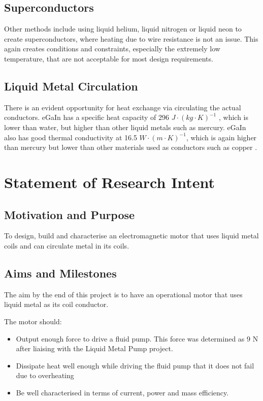 \documentclass[a4paper,12pt]{article}
\begin{document}
\subsection{Superconductors}
Other methods include using liquid helium\cite{hoenigDenseSupercriticalheliumCooled1975}, liquid nitrogen or liquid neon\cite{henkeChallengesOpportunitiesVery2018} to create superconductors, where heating due to wire resistance is not an issue. This again creates conditions and constraints, especially the extremely low temperature, that are not acceptable for most design requirements.

\subsection{Liquid Metal Circulation}
There is an evident opportunity for heat exchange via circulating the actual conductors. eGaIn has a specific heat capacity of 296 $J\cdot (kg\cdot K)^{-1}$ \cite{hodesPotentialGalinstanBasedMinichannel2014}, which is lower than water, but higher than other liquid metals such as mercury. eGaIn also has good thermal conductivity at 16.5 $W\cdot(m\cdot K)^{-1}$, which is again higher than mercury but lower than other materials used as conductors such as copper \cite{naveThermalConductivity2019}.

\newpage

\section{Statement of Research Intent}

\subsection{Motivation and Purpose}

To design, build and characterise an electromagnetic motor that uses liquid metal coils and can circulate metal in its coils.

\subsection{Aims and Milestones}

The aim by the end of this project is to have an operational motor that uses liquid metal as its coil conductor.

The motor should:
\begin{itemize}
    \item Output enough force to drive a fluid pump. This force was determined as 9 N after liaising with the Liquid Metal Pump project.
    \item Dissipate heat well enough while driving the fluid pump that it does not fail due to overheating
    \item Be well characterised in terms of current, power and mass efficiency.
\end{itemize}
\end{document}
